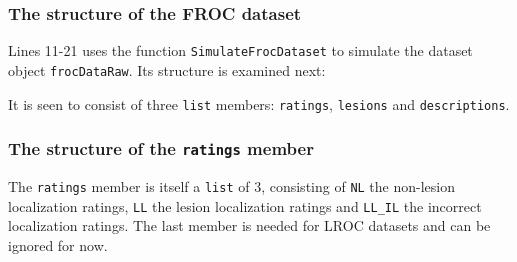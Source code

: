 \documentclass[
]{book}
\newenvironment{Shaded}{\begin{snugshade}}{\end{snugshade}}
\newcommand{\CommentTok}[1]{\textcolor[rgb]{0.56,0.35,0.01}{\textit{#1}}}
\newcommand{\KeywordTok}[1]{\textcolor[rgb]{0.13,0.29,0.53}{\textbf{#1}}}
\newcommand{\NormalTok}[1]{#1}
\begin{document}
\hypertarget{froc-empirical-examples-str-dataset}{%
\subsubsection{The structure of the FROC dataset}\label{froc-empirical-examples-str-dataset}}

Lines 11-21 uses the function \texttt{SimulateFrocDataset} to simulate the dataset object \texttt{frocDataRaw}. Its structure is examined next:

\begin{Shaded}
\end{Shaded}

It is seen to consist of three \texttt{list} members: \texttt{ratings}, \texttt{lesions} and \texttt{descriptions}.

\hypertarget{the-structure-of-the-ratings-member}{%
\subsubsection{\texorpdfstring{The structure of the \texttt{ratings} member}{The structure of the ratings member}}\label{the-structure-of-the-ratings-member}}

The \texttt{ratings} member is itself a \texttt{list} of 3, consisting of \texttt{NL} the non-lesion localization ratings, \texttt{LL} the lesion localization ratings and \texttt{LL\_IL} the incorrect localization ratings. The last member is needed for LROC datasets and can be ignored for now.
\end{document}
